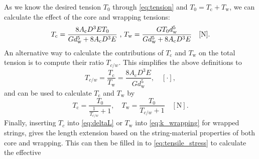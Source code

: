 \documentclass{article}
\begin{document}
\begin{sloppy}
\begin{equation}
\end{equation}
%
As we know the desired tension $T_0$ through \eqref{eq:tension} and $T_0 = T_\text{c} + T_\text{w}$, we can calculate the effect of the core and wrapping tensions:
%
\begin{equation}
    T_\text{c} = \frac{8A_\text{c}D^3ET_0}{Gd_\text{w}^5+8A_\text{c}D^3E}\text{ , } \newline
    T_\text{w} = \frac{GT_0d_\text{w}^5}{Gd_\text{w}^5 + 8A_\text{c}D^3E} \quad [\text{N}].
\end{equation}
%
An alternative way to calculate the contributions of $T_\text{c}$ and $T_\text{w}$ on the total tension is to compute their ratio $T_{c/w}$. This simplifies the above definitions to
%
\begin{equation}
    T_{c/w} = \frac{T_\text{c}}{T_\text{w}} = \frac{8A_\text{c}D^3E}{Gd_\text{w}^5},  \quad [\cdot],
\end{equation}
%
and can be used to calculate $T_\text{c}$ and $T_\text{w}$ by
%
\begin{equation}\label{eq:Tc_derived}
    T_\text{c} = \frac{T_0}{\frac{1}{T_{c/w}}+1}, \quad T_\text{w} = \frac{T_0}{T_{c/w}+1}\quad [\text{N}].
\end{equation}
%
Finally, inserting $T_c$ into \eqref{eq:deltaL} or $T_\text{w}$ into \eqref{eq:k_wrapping} for wrapped strings, gives the length extension based on the string-material properties of both core and wrapping. 
This can then be filled in to \eqref{eq:tensile_stress} to calculate the effective
%
%

\end{sloppy}
\end{document}
